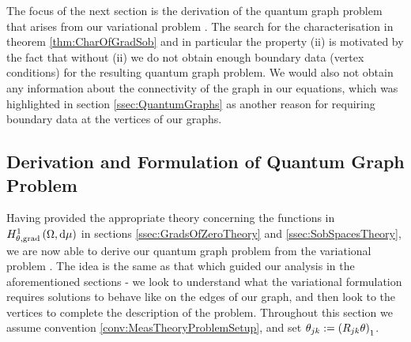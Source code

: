 The focus of the next section is the derivation of the quantum graph problem  that arises from our variational problem .
The search for the characterisation in theorem \ref{thm:CharOfGradSob} and in particular the property (ii) is motivated by the fact that without (ii) we do not obtain enough boundary data (vertex conditions) for the resulting quantum graph problem.
We would also not obtain any information about the connectivity of the graph in our equations, which was highlighted in section \ref{ssec:QuantumGraphs} as another reason for requiring boundary data at the vertices of our graphs.

\subsection{Derivation and Formulation of Quantum Graph Problem} \label{ssec:Derivation}
Having provided the appropriate theory concerning the functions in $H^1_{\theta, \mathrm{grad}}\left( \Omega, \mathrm{d}\mu \right)$ in sections \ref{ssec:GradsOfZeroTheory} and \ref{ssec:SobSpacesTheory}, we are now able to derive our quantum graph problem  from the variational problem .
The idea is the same as that which guided our analysis in the aforementioned sections - we look to understand what the variational formulation requires solutions to behave like on the edges of our graph, and then look to the vertices to complete the description of the problem.
Throughout this section we assume convention \ref{conv:MeasTheoryProblemSetup}, and set $\theta_{jk} := \left( R_{jk}\theta \right)_1$. \newline


